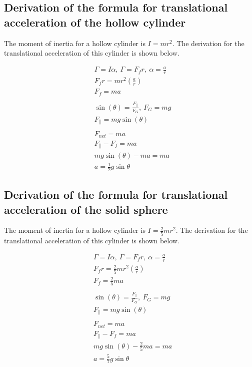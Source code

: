 \documentclass[letterpaper, 12pt]{article}
\begin{document}
\subsection{Derivation of the formula for translational acceleration of the hollow cylinder}

The moment of inertia for a hollow cylinder is $I = mr^2$. The derivation for the
translational acceleration of this cylinder is shown below.

\begin{align*}
     & \Gamma = I\alpha, ~ \Gamma = F_f r, ~ \alpha = \frac{a}{r}
    \\
     & F_f r = mr^2\left(\frac{a}{r}\right)
    \\
     & F_f = ma
    \\
    \\
     & \sin(\theta) = \frac{F_{\parallel}}{F_G}, ~ F_G = mg
    \\
     & F_{\parallel} = mg\sin(\theta)
    \\
    \\
     & F_{net} = ma
    \\
     & F_{\parallel} - F_f = ma
    \\
     & mg\sin(\theta) - ma = ma
    \\
     & a = \frac{1}{2}g\sin{\theta}
\end{align*}

\subsection{Derivation of the formula for translational acceleration of the solid sphere}

The moment of inertia for a hollow cylinder is $I = \frac{2}{5}mr^2$. The derivation for the
translational acceleration of this cylinder is shown below.

\begin{align*}
     & \Gamma = I\alpha, ~ \Gamma = F_f r, ~ \alpha = \frac{a}{r}
    \\
     & F_f r = \frac{2}{5}mr^2\left(\frac{a}{r}\right)
    \\
     & F_f = \frac{2}{5}ma
    \\
    \\
     & \sin(\theta) = \frac{F_{\parallel}}{F_G}, ~ F_G = mg
    \\
     & F_{\parallel} = mg\sin(\theta)
    \\
    \\
     & F_{net} = ma
    \\
     & F_{\parallel} - F_f = ma
    \\
     & mg\sin(\theta) - \frac{2}{5}ma = ma
    \\
     & a = \frac{5}{7}g\sin{\theta}
\end{align*}
\end{document}
